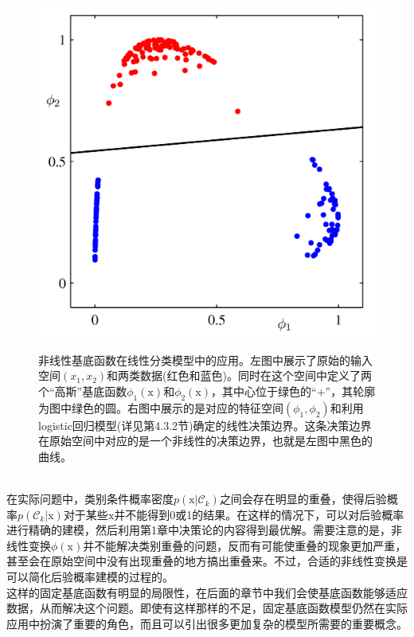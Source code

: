 \documentclass[b5paper]{book}
\numberwithin{equation}{chapter}
\newcommand {\bx} {\boldsymbol{\mathrm{x}}}
\newcommand {\calC} {\mathcal{C}}
\begin{document}
{\begin{figure}[ht]
\begin{minipage}[t]{0.5\linewidth}
		\includegraphics[scale=0.8]{Images/4-12b.png}
		\label{fig:4-12b}
		\end{minipage}
		\caption{非线性基底函数在线性分类模型中的应用。左图中展示了原始的输入空间$(x_1,x_2)$和两类数据(红色和蓝色)。同时在这个空间中定义了两个“高斯”基底函数$\phi_1(\bx)$和$\phi_2(\bx)$，其中心位于绿色的“+”，其轮廓为图中绿色的圆。右图中展示的是对应的特征空间$(\phi_1, \phi_2)$和利用logistic回归模型(详见第4.3.2节)确定的线性决策边界。这条决策边界在原始空间中对应的是一个非线性的决策边界，也就是左图中黑色的曲线。}
	\end{figure}
	\\
	\indent 在实际问题中，类别条件概率密度$p(\bx|\calC_k)$之间会存在明显的重叠，使得后验概率$p(\calC_k|\bx)$对于某些$\bx$并不能得到0或1的结果。在这样的情况下，可以对后验概率进行精确的建模，然后利用第1章中决策论的内容得到最优解。需要注意的是，非线性变换$\phi(\bx)$并不能解决类别重叠的问题，反而有可能使重叠的现象更加严重，甚至会在原始空间中没有出现重叠的地方搞出重叠来。不过，合适的非线性变换是可以简化后验概率建模的过程的。\\
	\indent 这样的固定基底函数有明显的局限性，在后面的章节中我们会使基底函数能够适应数据，从而解决这个问题。即使有这样那样的不足，固定基底函数模型仍然在实际应用中扮演了重要的角色，而且可以引出很多更加复杂的模型所需要的重要概念。
	}
\end{document}
